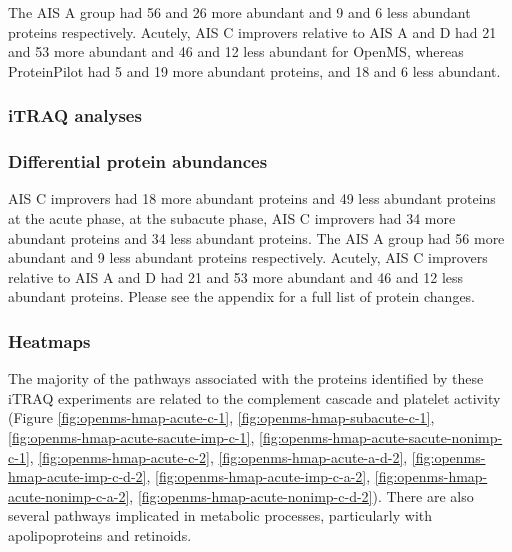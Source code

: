 \documentclass[9pt,lineno]{elife}
\begin{document}
The AIS A group had 56 and 26 more abundant and 9 and 6 less abundant proteins respectively.
Acutely, AIS C improvers relative to AIS A and D had 21 and 53 more abundant and 46 and 12 less abundant for OpenMS, whereas ProteinPilot had 5 and 19 more abundant proteins, and 18 and 6 less abundant.





\clearpage

\hypertarget{itraq-analyses}{%
\subsubsection{iTRAQ analyses}\label{itraq-analyses}}

\hypertarget{differential-protein-abundances}{%
\subsubsection{Differential protein abundances}\label{differential-protein-abundances}}

AIS C improvers had 18 more abundant proteins and 49 less abundant proteins at the acute phase, at the subacute phase, AIS C improvers had 34 more abundant proteins and 34 less abundant proteins. The AIS A group had 56 more abundant and 9 less abundant proteins respectively. Acutely, AIS C improvers relative to AIS A and D had 21 and 53 more abundant and 46 and 12 less abundant proteins. Please see the appendix for a full list of protein changes.

\hypertarget{heatmaps-chap3}{%
\subsubsection{Heatmaps}\label{heatmaps-chap3}}

The majority of the pathways associated with the proteins identified by these iTRAQ experiments are related to the complement cascade and platelet activity (Figure \ref{fig:openms-hmap-acute-c-1}, \ref{fig:openms-hmap-subacute-c-1}, \ref{fig:openms-hmap-acute-sacute-imp-c-1}, \ref{fig:openms-hmap-acute-sacute-nonimp-c-1}, \ref{fig:openms-hmap-acute-c-2}, \ref{fig:openms-hmap-acute-a-d-2}, \ref{fig:openms-hmap-acute-imp-c-d-2}, \ref{fig:openms-hmap-acute-imp-c-a-2}, \ref{fig:openms-hmap-acute-nonimp-c-a-2}, \ref{fig:openms-hmap-acute-nonimp-c-d-2}).
There are also several pathways implicated in metabolic processes, particularly with apolipoproteins and retinoids.
\end{document}
